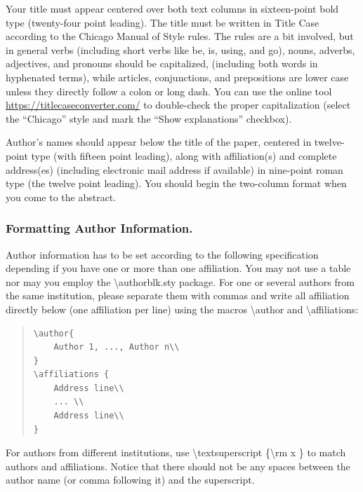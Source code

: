 Your title must appear centered over both text columns in sixteen-point
bold type (twenty-four point leading). The title must be written in
Title Case according to the Chicago Manual of Style rules. The rules are
a bit involved, but in general verbs (including short verbs like be, is,
using, and go), nouns, adverbs, adjectives, and pronouns should be
capitalized, (including both words in hyphenated terms), while articles,
conjunctions, and prepositions are lower case unless they directly
follow a colon or long dash. You can use the online tool
\url{https://titlecaseconverter.com/} to double-check the proper
capitalization (select the ``Chicago'' style and mark the ``Show
explanations'' checkbox).

Author's names should appear below the title of the paper, centered in
twelve-point type (with fifteen point leading), along with
affiliation(s) and complete address(es) (including electronic mail
address if available) in nine-point roman type (the twelve point
leading). You should begin the two-column format when you come to the
abstract.

\subsubsection{Formatting Author Information.}

Author information has to be set according to the following
specification depending if you have one or more than one affiliation.
You may not use a table nor may you employ the
\textbackslash authorblk.sty package. For one or several authors from
the same institution, please separate them with commas and write all
affiliation directly below (one affiliation per line) using the macros
\textbackslash author and \textbackslash affiliations:

\begin{quote}\begin{scriptsize}\begin{verbatim}
\author{
    Author 1, ..., Author n\\
}
\affiliations {
    Address line\\
    ... \\
    Address line\\
}
\end{verbatim}\end{scriptsize}\end{quote}

\noindent For authors from different institutions, use
\textbackslash textsuperscript \{\textbackslash rm x \} to match authors
and affiliations. Notice that there should not be any spaces between the
author name (or comma following it) and the superscript.

